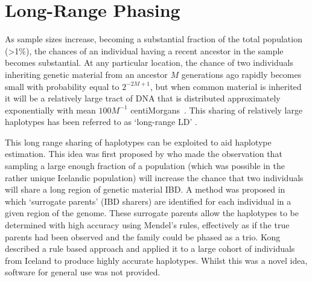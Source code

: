 \section{Long-Range Phasing}
 As sample sizes increase, becoming a substantial fraction of the total population (>1\%), the chances of an individual having a recent ancestor in the sample becomes substantial. At any particular location, the chance of two individuals inheriting genetic material from an ancestor $M$ generations ago rapidly becomes small with probability equal to $2^{-2M+1}$, but when common material is inherited it will be a relatively large tract of DNA that is distributed approximately exponentially with mean $100M^{-1}$ centiMorgans~\citep{browning2012identity}.  This sharing of relatively large haplotypes has been referred to as `long-range LD'  \citep{kong2008detection}.

This long range sharing of haplotypes can be exploited to aid haplotype estimation. This idea was first proposed by  \cite{kong2008detection} who made the observation that sampling a large enough fraction of a population (which was possible in the rather unique Icelandic population) will increase the chance that two individuals will share a long region of genetic material IBD. A method was proposed in which `surrogate parents' (IBD sharers) are identified for each individual in a given region of the genome. These surrogate parents allow the haplotypes to be determined with high accuracy using Mendel's rules, effectively as if the true parents had been observed and the family could be phased as a trio.  Kong described a rule based approach and applied it to a large cohort of individuals from Iceland  to produce highly accurate haplotypes. Whilst this was a novel idea, software for general use was not provided.

